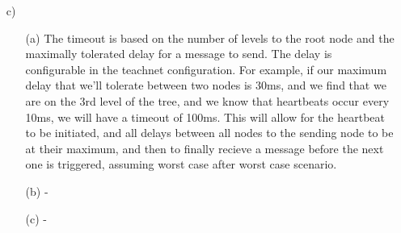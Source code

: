 \documentclass[12pt,a4paper]{article}
\begin{document}
\begin{enumerate}
\item[c)]
  \begin{enumerate}
  \item[(a)] The timeout is based on the number of levels to the root node and the maximally tolerated delay for a message to send. The delay is configurable in the teachnet configuration. For example, if our maximum delay that we'll tolerate between two nodes is 30ms, and we find that we are on the 3rd level of the tree, and we know that heartbeats occur every 10ms, we will have a timeout of 100ms. This will allow for the heartbeat to be initiated, and all delays between all nodes to the sending node to be at their maximum, and then to finally recieve a message before the next one is triggered, assuming worst case after worst case scenario.
  \item[(b)] -
  \item[(c)] -
  \end{enumerate}
\end{enumerate}
\end{document}
